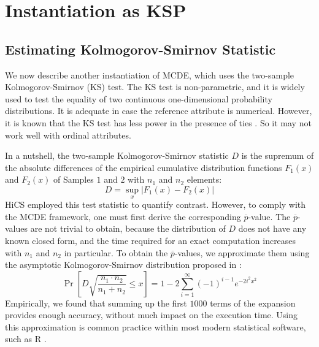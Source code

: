 \clearpage

\section{Instantiation as \acrfull{KSP}}
\label{sec:instantiatingKSP}

\subsection{Estimating Kolmogorov-Smirnov Statistic}

We now describe another instantiation of \gls{MCDE}, which uses the two-sample Kolmogorov-Smirnov (KS) test. 
The KS test is non-parametric, and it is widely used to test the equality of two continuous one-dimensional probability distributions. 
It is adequate in case the reference attribute is numerical. However, it is known that the KS test has less power in the presence of ties \cite{DBLP:books/daglib/0023683}. %
So it may not work well with ordinal attributes. 

In a nutshell, the two-sample Kolmogorov-Smirnov statistic $D$ is the supremum of the absolute differences of the empirical cumulative distribution functions $F_{1}(x)$ and $F_{2}(x)$ of Samples $1$ and $2$ with $n_1$ and $n_2$ elements: 
\begin{equation}
    D = \sup_{x} \left | F_{1}(x) - F_{2}(x) \right |
\end{equation}
\gls{HiCS} employed this test statistic to quantify contrast. 
However, to comply with the \gls{MCDE} framework, one must first derive the corresponding $\overline{p}$-value. 
The $\overline{p}$-values are not trivial to obtain, because the distribution of $D$ does not have any known closed form, and the time required for an exact computation increases with $n_1$ and $n_2$ in particular.  
To obtain the $\overline{p}$-values, we approximate them using the asymptotic Kol\-mo\-go\-rov-Smir\-nov distribution proposed in \cite{durbin1973distribution}: 
\begin{equation}
\label{asymptotic-ks}
\Pr \left[D \sqrt{ \frac{n_1 \cdot n_2}{n_1+n_2}} \leq x\right] = 1 -2 \sum_{i=1}^{\infty} (-1)^{i -1} e^{-2i^2x^2}
\end{equation}
Empirically, we found that summing up the first $1000$ terms of the expansion provides enough accuracy, without much impact on the execution time. %
Using this approximation is common practice within most modern statistical software, such as R \cite{R}. 

